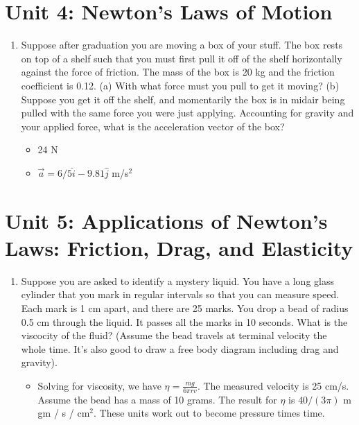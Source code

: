 \documentclass[10pt]{article}
\begin{document}
\section{Unit 4: Newton's Laws of Motion}
\begin{enumerate}
\item Suppose after graduation you are moving a box of your stuff.  The box rests on top of a shelf such that you must first pull it off of the shelf horizontally against the force of friction.  The mass of the box is 20 kg and the friction coefficient is 0.12.  (a) With what force must you pull to get it moving?  (b) Suppose you get it off the shelf, and momentarily the box is in midair being pulled with the same force you were just applying.  Accounting for gravity and your applied force, what is the acceleration vector of the box?
\begin{itemize}
\item 24 N
\item $\vec{a} = 6/5\hat{i} - 9.81\hat{j}$ m/s$^{2}$
\end{itemize}
\end{enumerate}

\section{Unit 5: Applications  of Newton's Laws: Friction, Drag, and Elasticity}
\begin{enumerate}
\item Suppose you are asked to identify a mystery liquid.  You have a long glass cylinder that you mark in regular intervals so that you can measure speed.  Each mark is 1 cm apart, and there are 25 marks.  You drop a bead of radius 0.5 cm through the liquid.  It passes all the marks in 10 seconds.  What is the viscocity of the fluid?  (Assume the bead travels at terminal velocity the whole time.  It's also good to draw a free body diagram including drag and gravity).
\begin{itemize}
\item Solving for viscosity, we have $\eta = \frac{mg}{6\pi r v}$.  The measured velocity is 25 cm/s.  Assume the bead has a mass of 10 grams.  The result for $\eta$ is $40/(3\pi)$ m gm / s / cm$^2$.  These units work out to become pressure times time.
\end{itemize}
\end{enumerate}
\end{document}
